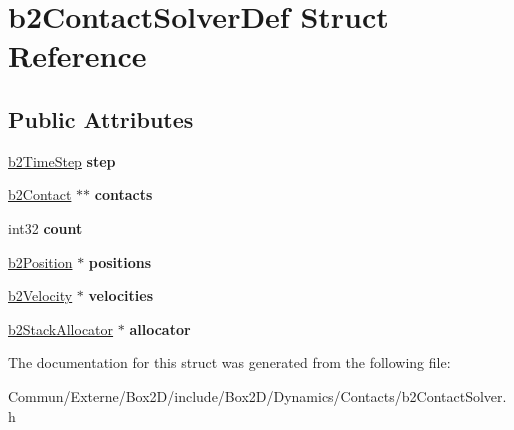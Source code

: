 \hypertarget{structb2_contact_solver_def}{}\section{b2\+Contact\+Solver\+Def Struct Reference}
\label{structb2_contact_solver_def}
\subsection*{Public Attributes}
\begin{DoxyCompactItemize}
\item 
\hyperlink{structb2_time_step}{b2\+Time\+Step} {\bfseries step}\hypertarget{structb2_contact_solver_def_a544604c01e6606ab54b8ccd5289a7ac7}{}\label{structb2_contact_solver_def_a544604c01e6606ab54b8ccd5289a7ac7}

\item 
\hyperlink{classb2_contact}{b2\+Contact} $\ast$$\ast$ {\bfseries contacts}\hypertarget{structb2_contact_solver_def_a4b9d708e3122cab8d9dabeafefc7a9af}{}\label{structb2_contact_solver_def_a4b9d708e3122cab8d9dabeafefc7a9af}

\item 
int32 {\bfseries count}\hypertarget{structb2_contact_solver_def_ae977ea1cee4b7b9ee99210d9b66f88ea}{}\label{structb2_contact_solver_def_ae977ea1cee4b7b9ee99210d9b66f88ea}

\item 
\hyperlink{structb2_position}{b2\+Position} $\ast$ {\bfseries positions}\hypertarget{structb2_contact_solver_def_aaf1432d040aa6279d91d8c9f24a4728a}{}\label{structb2_contact_solver_def_aaf1432d040aa6279d91d8c9f24a4728a}

\item 
\hyperlink{structb2_velocity}{b2\+Velocity} $\ast$ {\bfseries velocities}\hypertarget{structb2_contact_solver_def_ae839e5c5464aa54c1ad8ce1634b49a1f}{}\label{structb2_contact_solver_def_ae839e5c5464aa54c1ad8ce1634b49a1f}

\item 
\hyperlink{classb2_stack_allocator}{b2\+Stack\+Allocator} $\ast$ {\bfseries allocator}\hypertarget{structb2_contact_solver_def_a54198ac9886a988b9ffd06cf28c4c45c}{}\label{structb2_contact_solver_def_a54198ac9886a988b9ffd06cf28c4c45c}

\end{DoxyCompactItemize}


The documentation for this struct was generated from the following file\+:\begin{DoxyCompactItemize}
\item 
Commun/\+Externe/\+Box2\+D/include/\+Box2\+D/\+Dynamics/\+Contacts/b2\+Contact\+Solver.\+h\end{DoxyCompactItemize}
